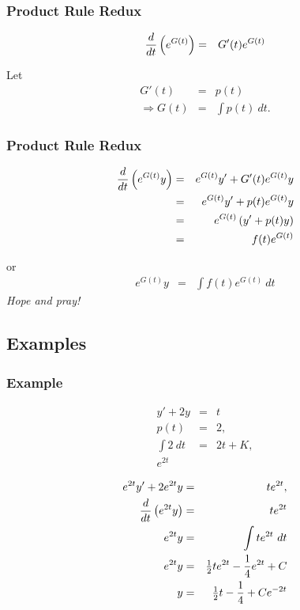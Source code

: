\begin{frame}
  \frametitle{Product Rule Redux}

  \begin{eqnarray*}
    \frac{d}{dt} \left( e^{G(t)} \right) & = & G'(t) e^{G(t)} 
  \end{eqnarray*}

  Let
  \begin{eqnarray*}
    G'(t) & = & p(t) \\
    \Rightarrow G(t) & = & \int p(t) ~ dt.
  \end{eqnarray*}


\end{frame}


\begin{frame}
  \frametitle{Product Rule Redux}

  \begin{eqnarray*}
    \frac{d}{dt} \left( e^{G(t)} y \right) & = & e^{G(t)} y' + G'(t) e^{G(t)} y \\
    & = & e^{G(t)} y' + p(t) e^{G(t)} y \\
    & = & e^{G(t)} \left( y' + p(t) y \right) \\
    & = & f(t) e^{G(t)}
  \end{eqnarray*}

  or
  \begin{eqnarray*}
    e^{G(t)} y & = & \int f(t) e^{G(t)} ~ dt
  \end{eqnarray*}
  \textit{Hope and pray!}

\end{frame}


\subsection{Examples}

\begin{frame}
  \frametitle{Example}

  \vspace*{-3em}
  \begin{eqnarray*}
    y' + 2y & = & t \\
    p(t) & = & 2, \\
    \int 2 ~ dt & = & 2t + K, \\
    e^{2t} & & 
  \end{eqnarray*}

  \begin{eqnarray*}
    e^{2t} y' + 2 e^{2t} y & = & t e^{2t}, \\
    \frac{d}{dt} \left( e^{2t} y \right) & = & t e^{2t} \\
    e^{2t} y & = & \int t e^{2t} ~ dt \\
    e^{2t} y & = & \mbox{$\frac{1}{2}$} t e^{2t} - \frac{1}{4} e^{2t} + C \\
    y & = & \mbox{$\frac{1}{2}$} t - \frac{1}{4} + C e^{-2t}
  \end{eqnarray*}

\end{frame}


